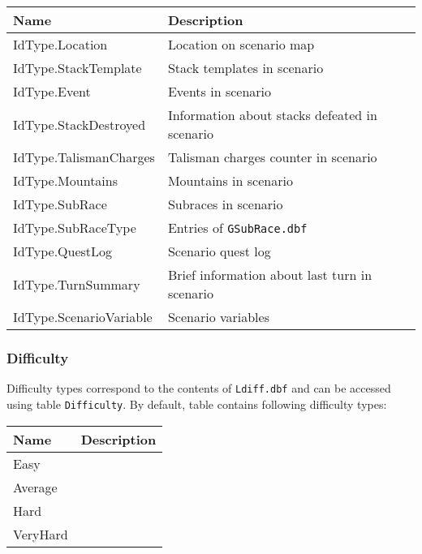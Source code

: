 \begin{tabularx}{\linewidth}{| l | X |}
\hline
\textbf{Name} & \textbf{Description} \\
\hline
IdType.Location & Location on scenario map\\
\hline
IdType.StackTemplate & Stack templates in scenario\\
\hline
IdType.Event & Events in scenario\\
\hline
IdType.StackDestroyed & Information about stacks defeated in scenario\\
\hline
IdType.TalismanCharges & Talisman charges counter in scenario\\
\hline
IdType.Mountains & Mountains in scenario\\
\hline
IdType.SubRace & Subraces in scenario\\
\hline
IdType.SubRaceType & Entries of \texttt{GSubRace.dbf}\\
\hline
IdType.QuestLog & Scenario quest log\\
\hline
IdType.TurnSummary & Brief information about last turn in scenario\\
\hline
IdType.ScenarioVariable & Scenario variables\\
\hline
\end{tabularx}

\subsubsection{Difficulty}
\label{Difficulty}
Difficulty types correspond to the contents of \texttt{Ldiff.dbf} and can be accessed using table \texttt{Difficulty}.
By default, table contains following difficulty types:\\
\begin{tabularx}{\linewidth}{| l | X |}
\hline
\textbf{Name} & \textbf{Description} \\
\hline
Easy &\\
\hline
Average &\\
\hline
Hard &\\
\hline
VeryHard &\\
\hline
\end{tabularx}
